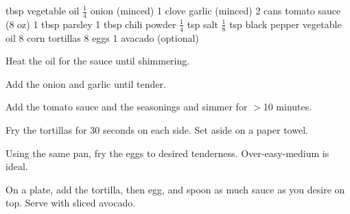 \dishtype{\breakfast}
\dishother{\vegetarian}
\begin{ingreds}
     tbsp vegetable oil
        $\frac{1}{4}$ onion (minced)
        1 clove garlic (minced)
        2 cans tomato sauce (8 oz)
        1 tbsp parsley
        1 tbsp chili powder
        $\frac{1}{4}$ tsp salt
        $\frac{1}{8}$ tsp black pepper
    \columnbreak{}
    vegetable oil
    8 corn tortillas
    8 eggs
    1 avacado (optional)
\end{ingreds}
\begin{method}
    Heat the oil for the sauce until shimmering.\par
    Add the onion and garlic until tender.\par
    Add the tomato sauce and the seasonings and simmer for $>$10 minutes.\par
    Fry the tortillas for 30 seconds on each side. Set aside on a paper towel.\par
    Using the same pan, fry the eggs to desired tenderness. Over-easy-medium is ideal.\par
    On a plate, add the tortilla, then egg, and spoon as much sauce as you desire on top. Serve with sliced avocado.
\end{method}